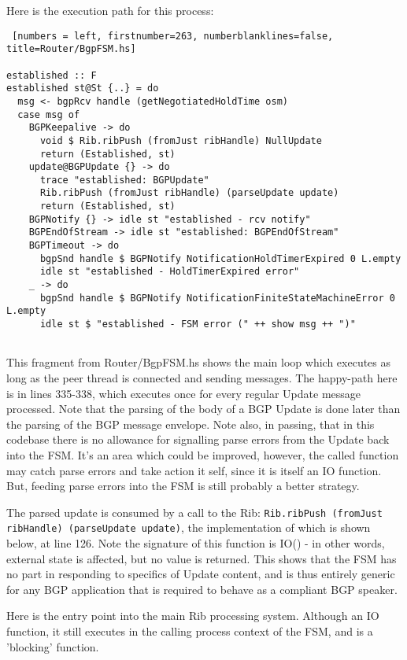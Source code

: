 Here is the execution path for this process:
\begin{lstlisting} [numbers = left, firstnumber=263, numberblanklines=false, title=Router/BgpFSM.hs]

established :: F
established st@St {..} = do
  msg <- bgpRcv handle (getNegotiatedHoldTime osm)
  case msg of
    BGPKeepalive -> do
      void $ Rib.ribPush (fromJust ribHandle) NullUpdate
      return (Established, st)
    update@BGPUpdate {} -> do
      trace "established: BGPUpdate"
      Rib.ribPush (fromJust ribHandle) (parseUpdate update)
      return (Established, st)
    BGPNotify {} -> idle st "established - rcv notify"
    BGPEndOfStream -> idle st "established: BGPEndOfStream"
    BGPTimeout -> do
      bgpSnd handle $ BGPNotify NotificationHoldTimerExpired 0 L.empty
      idle st "established - HoldTimerExpired error"
    _ -> do
      bgpSnd handle $ BGPNotify NotificationFiniteStateMachineError 0 L.empty
      idle st $ "established - FSM error (" ++ show msg ++ ")"
          
\end{lstlisting}
This fragment from Router/BgpFSM.hs shows the main loop which executes as long as the peer thread is connected and sending messages.  The happy-path here is in lines 335-338, which executes once for every regular Update message processed.  Note that the parsing of the body of a BGP Update is done later than the parsing of the BGP message envelope.  Note also, in passing, that in this codebase there is no allowance for signalling parse errors from the Update back into the FSM.  It's an area which could be improved, however, the called function may catch parse errors and take action it self, since it is itself an IO function.  But, feeding parse errors into the FSM is still probably a better strategy.

The parsed update is consumed by a call to the Rib: \lstinline{Rib.ribPush (fromJust ribHandle) (parseUpdate update)}, the implementation of which is shown below, at line 126.  Note the signature of this function is IO() - in other words, external state is affected, but no value is returned.  This shows that the FSM has no part in responding to specifics of Update content, and is thus entirely generic for any BGP application that is required to behave as a compliant BGP speaker.

Here is the entry point into the main Rib processing system.  Although an IO function, it still executes in the calling process context of the FSM, and is a 'blocking' function.

